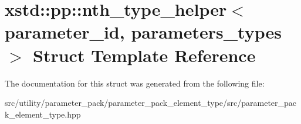 \hypertarget{structxstd_1_1pp_1_1nth__type__helper}{\section{xstd\-:\-:pp\-:\-:nth\-\_\-type\-\_\-helper$<$ parameter\-\_\-id, parameters\-\_\-types $>$ Struct Template Reference}
\label{structxstd_1_1pp_1_1nth__type__helper}
}


The documentation for this struct was generated from the following file\-:\begin{DoxyCompactItemize}
\item 
src/utility/parameter\-\_\-pack/parameter\-\_\-pack\-\_\-element\-\_\-type/src/parameter\-\_\-pack\-\_\-element\-\_\-type.\-hpp\end{DoxyCompactItemize}
